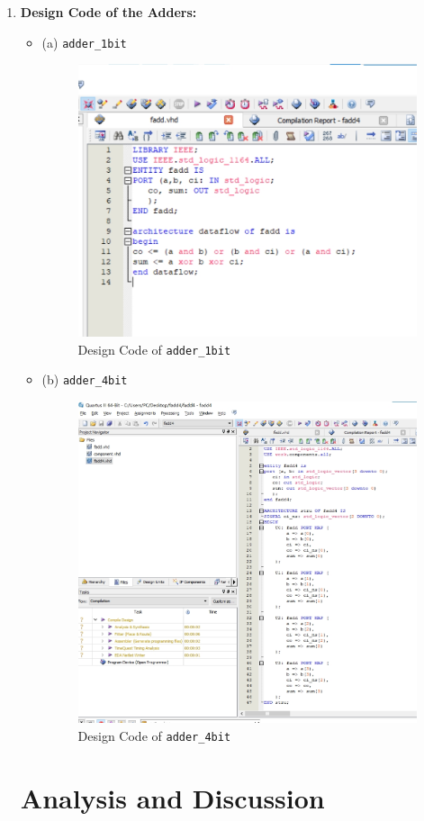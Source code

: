 \documentclass[12pt,a4paper,oneside]{ctexart}
\begin{document}
\begin{enumerate}
    \item \textbf{Design Code of the Adders:}
    \begin{itemize}
        \item (a) \texttt{adder\_1bit}
        \begin{figure}[h]
            \centering
            \includegraphics[width=0.4\linewidth]{adder_1bit_code} %
            \caption{Design Code of \texttt{adder\_1bit}}
            \label{fig:adder_1bit_code}
        \end{figure}
        \item (b) \texttt{adder\_4bit}
        \begin{figure}[h]
            \centering
            \includegraphics[width=0.65\linewidth]{adder_4bit_code} %
            \caption{Design Code of \texttt{adder\_4bit}}
            \label{fig:adder_4bit_code}
        \end{figure}
    \end{itemize}

\section{Analysis and Discussion}


\end{enumerate}
\end{document}
